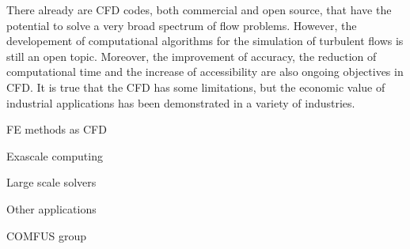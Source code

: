 There already are CFD codes, both commercial and open source, that have the potential to solve a very broad spectrum of flow problems. However, the developement of computational algorithms for the simulation of turbulent flows is still an open topic. Moreover, the improvement of accuracy, the reduction of computational time and the increase of accessibility are also ongoing objectives in CFD. It is true that the CFD has some limitations, but the economic value of industrial applications has been demonstrated in a variety of industries.


FE methods as CFD

Exascale computing

Large scale solvers

Other applications 

COMFUS group


%
%

